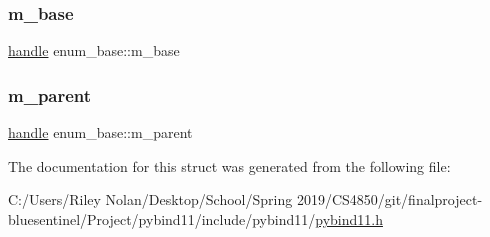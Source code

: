 \subsubsection{\texorpdfstring{m\_base}{m\_base}}
{\footnotesize\ttfamily \mbox{\hyperlink{classhandle}{handle}} enum\+\_\+base\+::m\+\_\+base}

\mbox{\label{structenum__base_ac56daf79223e3ac3068558b19a56ede9}} 
\subsubsection{\texorpdfstring{m\_parent}{m\_parent}}
{\footnotesize\ttfamily \mbox{\hyperlink{classhandle}{handle}} enum\+\_\+base\+::m\+\_\+parent}



The documentation for this struct was generated from the following file\+:\begin{DoxyCompactItemize}
\item 
C\+:/\+Users/\+Riley Nolan/\+Desktop/\+School/\+Spring 2019/\+C\+S4850/git/finalproject-\/bluesentinel/\+Project/pybind11/include/pybind11/\mbox{\hyperlink{pybind11_8h}{pybind11.\+h}}\end{DoxyCompactItemize}
